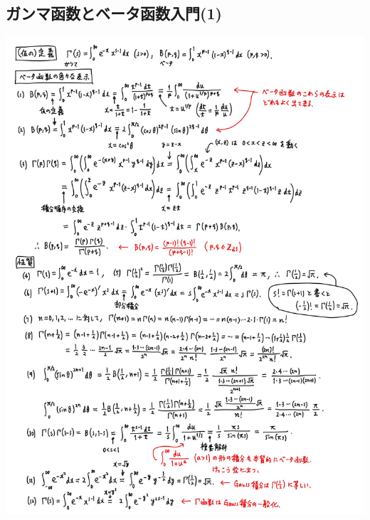 \documentclass[12pt,a4paper,xelatex,ja=standard]{bxjsarticle}
\begin{document}
\subsection{ガンマ函数とベータ函数入門(1)}
\begin{center}
\includegraphics[width=0.8\linewidth]{images/GammaBeta01.jpg}
\end{center}
\end{document}
